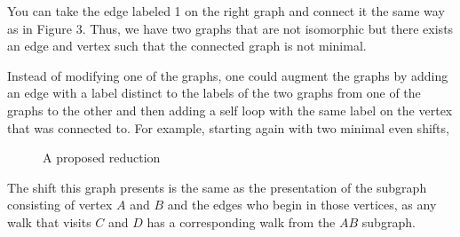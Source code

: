 \documentclass{article}
\begin{document}
You can take the edge labeled 1 on the right graph and connect it the same way as in Figure 3.
Thus, we have two graphs that are not isomorphic but there exists an edge and vertex such 
that the connected graph is not minimal. 

\newpage

Instead of modifying one of the graphs, one could augment the graphs by adding an 
edge with a label distinct to the labels of the two graphs from one of the graphs to 
the other and then adding a self loop with the same label on the vertex that was 
connected to. For example, starting again with two minimal even shifts,

\begin{figure}[h]
    \centering
    \caption{A proposed reduction}
\end{figure}

The shift this graph presents is the same as the presentation of 
the subgraph consisting of vertex \(A\) and \(B\) and the edges
who begin in those vertices, as any walk that visits \(C\) and \(D\)
has a corresponding walk from the \(AB\) subgraph.


\printbibliography
\end{document}
